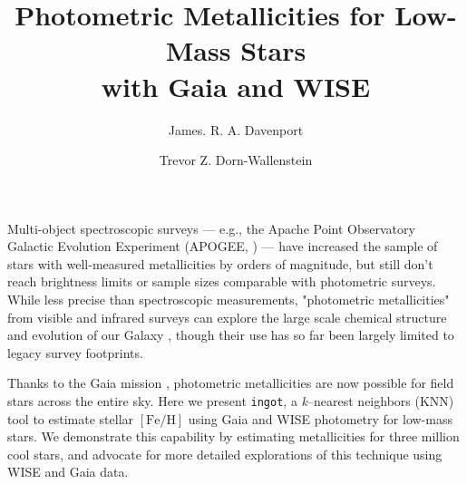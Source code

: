 \documentclass[modern]{rnaastex}
\newcommand{\ingot}{{\tt ingot}\xspace} %
\newcommand{\feh}{$[\mathrm{Fe}/\mathrm{H}]$\xspace}
\begin{document}
\title{Photometric Metallicities for Low-Mass Stars\\ with Gaia and WISE}


\author[0000-0002-0637-835X]{James. R. A. Davenport}

\author[0000-0003-3601-3180]{Trevor Z. Dorn-Wallenstein}



\section{} 

Multi-object spectroscopic surveys --- e.g., the Apache Point Observatory Galactic Evolution Experiment (APOGEE, \citealt{majewski17}) --- have increased the sample of stars with well-measured metallicities by orders of magnitude, but still don't reach brightness limits or sample sizes comparable with photometric surveys. 
While less precise than spectroscopic measurements, "photometric metallicities" from visible and infrared surveys can explore the large scale chemical structure and evolution of our Galaxy \citep[e.g.][]{ivezic08,schmidt16}, though their use has so far been largely limited to legacy survey footprints.


Thanks to the Gaia mission \citep{gaia_dr2}, photometric metallicities are now possible for field stars across the entire sky. Here we present \ingot, a {\it k}--nearest neighbors (KNN) tool to estimate stellar \feh using Gaia and WISE photometry for low-mass stars. We demonstrate this capability by estimating metallicities for three million cool stars, and advocate for more detailed explorations of this technique using WISE and Gaia data.
\end{document}
